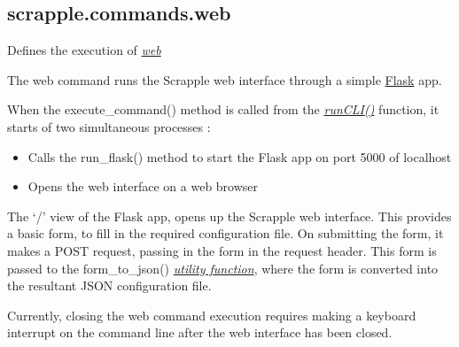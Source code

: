 \documentclass[letterpaper,12pt,english]{sphinxmanual}
\begin{document}
\label{implementation/commands:module-scrapple.commands.web}

\subsection{scrapple.commands.web}
\label{implementation/commands:scrapple-commands-web}

\begin{fulllineitems}
\label{implementation/commands:scrapple.commands.web.WebCommand}
Defines the execution of {\hyperref[framework/commands:command-web]{\emph{web}}}

\begin{fulllineitems}
\label{implementation/commands:scrapple.commands.web.WebCommand.execute_command}
The web command runs the Scrapple web interface through a simple         \href{http://flask.pocoo.org}{Flask} app.

When the execute\_command() method is called from the         {\hyperref[implementation/cli:implementation-cli]{\emph{runCLI()}}} function, it starts of two simultaneous         processes :
\begin{itemize}
\item {} 
Calls the run\_flask() method to start the Flask app on port 5000 of localhost

\item {} 
Opens the web interface on a web browser

\end{itemize}

The `/' view of the Flask app, opens up the Scrapple web interface. This         provides a basic form, to fill in the required configuration file. On submitting         the form, it makes a POST request, passing in the form in the request header.         This form is passed to the form\_to\_json()         {\hyperref[implementation/utils:implementation-utils]{\emph{utility function}}}, where the form is converted into         the resultant JSON configuration file.

Currently, closing the web command execution requires making a keyboard interrupt         on the command line after the web interface has been closed.

\end{fulllineitems}


\end{fulllineitems}
\end{document}

